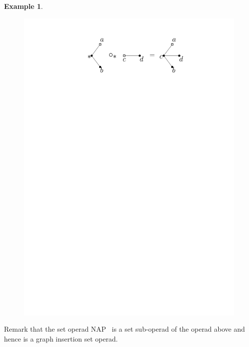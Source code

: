 \documentclass[a4paper]{article}
\theoremstyle{definition}
\newtheorem{example}[definition]{Example}
\begin{document}
\begin{example}
\begin{figure}[htbp]
\begin{center}
\includegraphics[scale=0.5]{fig/gcomp1}
\end{center}
\end{figure}

Remark that the set operad NAP~\cite{Liv06} is a set sub-operad of the operad above 
and hence is a graph insertion set operad.
\end{example}
\end{document}

